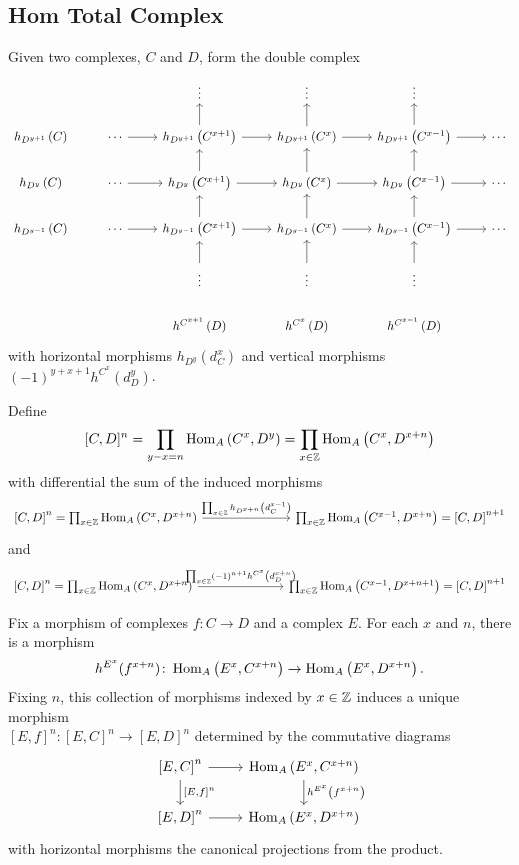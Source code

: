 \documentclass[dissertation.tex]{subfiles}
\begin{document}
\subsection{Hom Total Complex}
Given two complexes, $C$ and $D$, form the double complex
$$\begin{tikzcd}
  & & \vdots & \vdots & \vdots\\
  h_{D^{y+1}}\left(C\right) & \cdots \arrow{r} & h_{D^{y+1}}\left(C^{x+1}\right)\arrow{u}\arrow{r} & h_{D^{y+1}}\left(C^x\right)\arrow{u}\arrow{r} & h_{D^{y+1}}\left(C^{x-1}\right) \arrow{u}\arrow{r} & \cdots\\
  h_{D^{y}}\left(C\right) & \cdots \arrow{r} & h_{D^{y}}\left(C^{x+1}\right)\arrow{u}\arrow{r} & h_{D^{y}}\left(C^x\right)\arrow{u}\arrow{r} & h_{D^{y}}\left(C^{x-1}\right) \arrow{u}\arrow{r} & \cdots\\
  h_{D^{y-1}}\left(C\right) & \cdots \arrow{r} & h_{D^{y-1}}\left(C^{x+1}\right)\arrow{u}\arrow{r} & h_{D^{y-1}}\left(C^x\right)\arrow{u}\arrow{r} & h_{D^{y-1}}\left(C^{x-1}\right) \arrow{u}\arrow{r} & \cdots\\
  & & \vdots\arrow{u} & \vdots\arrow{u} & \vdots\arrow{u}\\
  & & h^{C^{x+1}}\left(D\right) & h^{C^x}\left(D\right) & h^{C^{x-1}}\left(D\right)
\end{tikzcd}$$
with horizontal morphisms $h_{D^{y}}\left(d_C^x\right)$ and vertical morphisms $(-1)^{y+x+1}h^{C^x}\left(d_D^y\right)$.
\begin{defn}\label{ChInternalHomDefn}
  Define 
  $$[C,D]^n = \prod_{y - x = n} \operatorname{Hom}_{A}\left(C^x,D^y\right) = \prod_{x \in \mathbb{Z}} \operatorname{Hom}_{A}\left(C^x,D^{x+n}\right)$$
  with differential the sum of the induced morphisms
  $$\begin{tikzcd}
    \left[C,D\right]^n = \prod_{x \in \Z} \Hom{A}{C^x,D^{x + n}} \arrow{rrr}{\prod_{x \in \Z} h_{D^{x + n}}\left(d_C^{x - 1}\right)} &&& \prod_{x \in \Z} \Hom{A}{C^{x-1},D^{x + n}} = \left[C,D\right]^{n+1}
  \end{tikzcd}$$
  and
  $$\begin{tikzcd}
    \left[C,D\right]^n = \prod_{x \in \Z} \Hom{A}{C^x,D^{x + n}} \arrow{rrr}{\prod_{x \in \Z} (-1)^{n + 1}h^{C^{x}}\left(d_D^{x + n}\right)} &&& \prod_{x \in \Z} \Hom{A}{C^{x-1},D^{x + n + 1}} = \left[C,D\right]^{n+1}
  \end{tikzcd}$$
\end{defn}

Fix a morphism of complexes $f : C \to D$ and a complex $E$.
For each $x$ and $n$, there is a morphism
$$h^{E^x}(f^{x+n}) \colon \operatorname{Hom}_{A}\left(E^x,C^{x + n}\right) \to \operatorname{Hom}_{A}\left(E^x,D^{x+n}\right).$$
Fixing $n$, this collection of morphisms indexed by $x \in \mathbb{Z}$ induces a unique morphism\\ $[E,f]^n \colon [E,C]^n \to [E,D]^n$ determined by the commutative diagrams 
$$\begin{tikzcd}
  \left[E,C\right]^n \arrow{r}\arrow{d}{[E,f]^n} & \Hom{A}{E^x,C^{x+n}}\arrow{d}{h^{E^x}\left(f^{x+n}\right)}\\
  \left[E,D\right]^n \arrow{r} & \Hom{A}{E^x,D^{x+n}}
\end{tikzcd}$$
with horizontal morphisms the canonical projections from the product.
\end{document}

